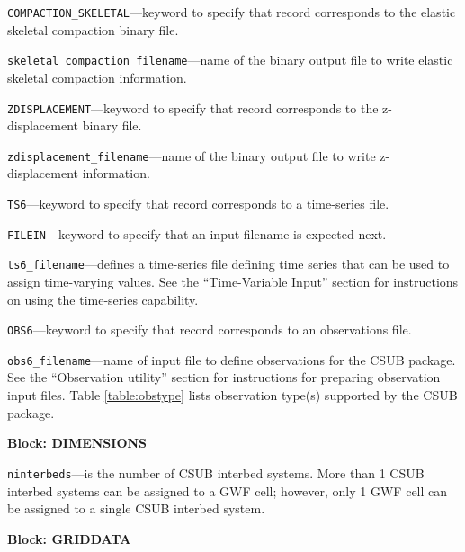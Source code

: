 \begin{description}
\item \texttt{COMPACTION\_SKELETAL}---keyword to specify that record corresponds to the elastic skeletal compaction binary file.

\item \texttt{skeletal\_compaction\_filename}---name of the binary output file to write elastic skeletal compaction information.

\item \texttt{ZDISPLACEMENT}---keyword to specify that record corresponds to the z-displacement binary file.

\item \texttt{zdisplacement\_filename}---name of the binary output file to write z-displacement information.

\item \texttt{TS6}---keyword to specify that record corresponds to a time-series file.

\item \texttt{FILEIN}---keyword to specify that an input filename is expected next.

\item \texttt{ts6\_filename}---defines a time-series file defining time series that can be used to assign time-varying values. See the ``Time-Variable Input'' section for instructions on using the time-series capability.

\item \texttt{OBS6}---keyword to specify that record corresponds to an observations file.

\item \texttt{obs6\_filename}---name of input file to define observations for the CSUB package. See the ``Observation utility'' section for instructions for preparing observation input files. Table \ref{table:obstype} lists observation type(s) supported by the CSUB package.

\end{description}
\item \textbf{Block: DIMENSIONS}

\begin{description}
\item \texttt{ninterbeds}---is the number of CSUB interbed systems.  More than 1 CSUB interbed systems can be assigned to a GWF cell; however, only 1 GWF cell can be assigned to a single CSUB interbed system.

\end{description}
\item \textbf{Block: GRIDDATA}

